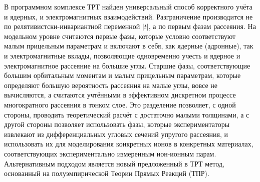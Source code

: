 \documentclass[a4paper,12pt]{article}
\begin{document}
\begin{large}
	В программном комплексе ТРТ найден универсальный способ корректного учёта и ядерных, и электромагнитных взаимодействий.
	Разграничение производится не по релятивистски-инвариантной переменной $|t|$, а по первым фазам рассеяния.
	На модельном уровне считаются первые фазы, которые условно соответствуют малым прицельным параметрам и включают в себя, как ядерные (адронные), так и электромагнитные вклады, позволяющие одновременно учесть и ядерное и электромагнитное рассеяние на большие углы.
	Старшие фазы, соответствующие большим орбитальным моментам и малым прицельным параметрам, которые определяют большую вероятность рассеяния на малые углы, вовсе не вычисляются, а считаются учтёнными в эффективном дискретном процессе многократного рассеяния в тонком слое.
	Это разделение позволяет, с одной стороны, проводить теоретический расчёт с достаточно малыми толщинами, а с другой стороны позволяет использовать фазы, которые экспериментаторы извлекают из дифференциальных угловых сечений упругого рассеяния, и использовать их для моделирования конкретных ионов в конкретных материалах, соответствующих экспериментально измеренным ион-ионным парам.
	Альтернативным подходом является новый предложенный в ТРТ метод, основанный на полуэмпирической Теории Прямых Реакций (ТПР).


\end{large}
\end{document}
